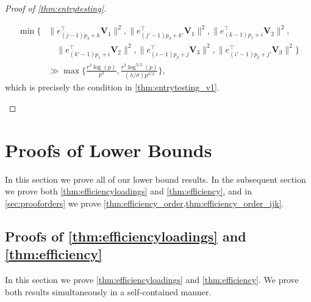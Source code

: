 \documentclass[10pt]{article}
\newcommand{\0}{{\mathbf{0}}}
\newcommand{\1}{{\mathbf{1}}}
\renewcommand{\t}{^{\top}}
\begin{document}
\begin{proof}[Proof of \cref{thm:entrytesting}]
\begin{itemize}
\begin{align*}
         \min\bigg\{ &\| e_{(j-1)p_3 + k }\t \mathbf{V}_1\|^2, \| e_{(j'-1)p_3 + k'}\t \mathbf{V}_1\|^2, \| e_{(k-1)p_1 + i}\t \mathbf{V}_2 \|^2, \\
         &\quad \| e_{(k'-1)p_1 + i}\t \mathbf{V}_2 \|^2, \| e_{(i-1)p_2 + j}\t \mathbf{V}_3 \|^2, \| e_{(i'-1)p_2 + j'}\t \mathbf{V}_3 \|^2 \bigg\} \\
    &\gg \max\bigg\{ \frac{r^{3} \log(p)}{p^3} , \frac{r^{3} \log^{3/2}(p)}{(\lambda/\sigma)p^{3/2}}\bigg\},
    \end{align*}
    which is precisely the condition in \cref{thm:entrytesting_v1}. 
    \end{itemize}
\end{proof}

\section{Proofs of Lower Bounds} \label{sec:efficiencyproof}
In this section we prove all of our lower bound results.  In the subsequent section we prove both  \cref{thm:efficiencyloadings} and \cref{thm:efficiency}, and in \cref{sec:prooforders} we prove \cref{thm:efficiency_order,thm:efficiency_order_ijk}.
\subsection{Proofs of \cref{thm:efficiencyloadings} and \cref{thm:efficiency}}
In this section we prove %
\cref{thm:efficiencyloadings} and \cref{thm:efficiency}.  We prove both results simultaneously in a self-contained manner.  
\end{document}
